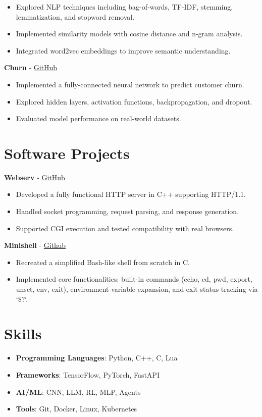 \documentclass[a4paper,11pt]{article}%
\begin{document}
\begin{itemize}[leftmargin=2em,label={},parsep=0pt,topsep=1em]%
\item Explored NLP techniques including bag-of-words, TF-IDF, stemming, lemmatization, and stopword removal.%
\item Implemented similarity models with cosine distance and n-gram analysis.%
\item Integrated word2vec embeddings to improve semantic understanding.%
\end{itemize}%
%
\noindent \textbf{Churn} - \href{https://github.com/sboof911/churn}{GitHub}%
\begin{itemize}[leftmargin=2em,label={},parsep=0pt,topsep=1em]%
\item Implemented a fully-connected neural network to predict customer churn.%
\item Explored hidden layers, activation functions, backpropagation, and dropout.%
\item Evaluated model performance on real-world datasets.%
\end{itemize}%
\section*{Software Projects}%
%
\noindent \textbf{Webserv} - \href{https://github.com/sboof911/webserv}{GitHub}%
\begin{itemize}[leftmargin=2em,label={},parsep=0pt,topsep=1em]%
\item Developed a fully functional HTTP server in C++ supporting HTTP/1.1.%
\item Handled socket programming, request parsing, and response generation.%
\item Supported CGI execution and tested compatibility with real browsers.%
\end{itemize}%
%
\noindent \textbf{Minishell} - \href{https://github.com/sboof911/minishell}{Github}%
\begin{itemize}[leftmargin=2em,label={},parsep=0pt,topsep=1em]%
\item Recreated a simplified Bash-like shell from scratch in C.%
\item Implemented core functionalities: built-in commands (echo, cd, pwd, export, unset, env, exit), environment variable expansion, and exit status tracking via `\$?`.%
\end{itemize}%
\section*{Skills}%
\begin{itemize}[leftmargin=*]%
\item \textbf{Programming Languages}: Python, C++, C, Lua%
\item \textbf{Frameworks}: TensorFlow, PyTorch, FastAPI%
\item \textbf{AI/ML}: CNN, LLM, RL, MLP, Agents%
\item \textbf{Tools}: Git, Docker, Linux, Kubernetes%
\end{itemize}%
\end{document}
